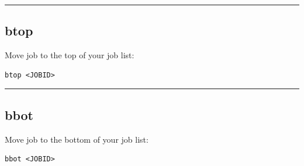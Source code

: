 \documentclass[11pt]{article}
\begin{document}
    \begin{center}\rule{0.5\linewidth}{\linethickness}\end{center}

    \subsection{btop}\label{btop}

Move job to the top of your job list:

\begin{verbatim}
btop <JOBID>
\end{verbatim}

    \begin{center}\rule{0.5\linewidth}{\linethickness}\end{center}

    \subsection{bbot}\label{bbot}

Move job to the bottom of your job list:

\begin{verbatim}
bbot <JOBID>
\end{verbatim}


\end{document}
